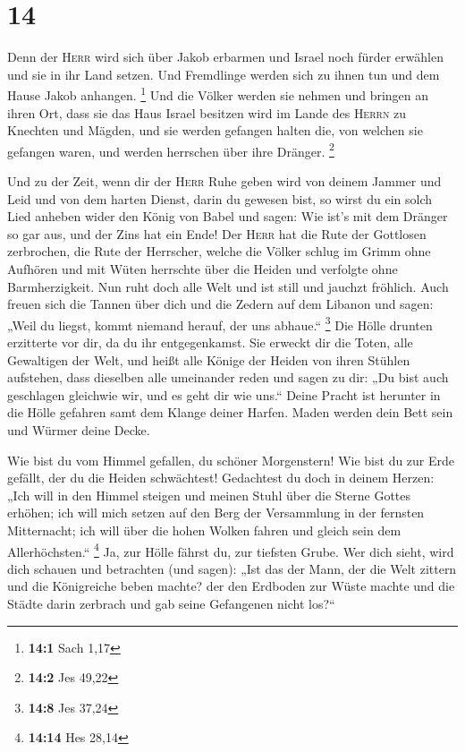 \hypertarget{section-7}{%
\section{14}\label{section-7}}

 Denn der \textsc{Herr} wird sich über Jakob erbarmen und
Israel noch fürder erwählen und sie in ihr Land setzen. Und Fremdlinge
werden sich zu ihnen tun und dem Hause Jakob anhangen. \footnote{\textbf{14:1}
  Sach 1,17}  Und die Völker werden sie nehmen und bringen
an ihren Ort, dass sie das Haus Israel besitzen wird im Lande des
\textsc{Herrn} zu Knechten und Mägden, und sie werden gefangen halten
die, von welchen sie gefangen waren, und werden herrschen über ihre
Dränger. \footnote{\textbf{14:2} Jes 49,22}

 Und zu der Zeit, wenn dir der \textsc{Herr} Ruhe geben
wird von deinem Jammer und Leid und von dem harten Dienst, darin du
gewesen bist,  so wirst du ein solch Lied anheben wider
den König von Babel und sagen: Wie ist's mit dem Dränger so gar aus, und
der Zins hat ein Ende!  Der \textsc{Herr} hat die Rute der
Gottlosen zerbrochen, die Rute der Herrscher,  welche die
Völker schlug im Grimm ohne Aufhören und mit Wüten herrschte über die
Heiden und verfolgte ohne Barmherzigkeit.  Nun ruht doch
alle Welt und ist still und jauchzt fröhlich.  Auch freuen
sich die Tannen über dich und die Zedern auf dem Libanon und sagen:
„Weil du liegst, kommt niemand herauf, der uns abhaue.`` \footnote{\textbf{14:8}
  Jes 37,24}  Die Hölle drunten erzitterte vor dir, da du
ihr entgegenkamst. Sie erweckt dir die Toten, alle Gewaltigen der Welt,
und heißt alle Könige der Heiden von ihren Stühlen aufstehen,
 dass dieselben alle umeinander reden und sagen zu dir:
„Du bist auch geschlagen gleichwie wir, und es geht dir wie uns.``
 Deine Pracht ist herunter in die Hölle gefahren samt dem
Klange deiner Harfen. Maden werden dein Bett sein und Würmer deine
Decke.

 Wie bist du vom Himmel gefallen, du schöner Morgenstern!
Wie bist du zur Erde gefällt, der du die Heiden schwächtest!
 Gedachtest du doch in deinem Herzen: „Ich will in den
Himmel steigen und meinen Stuhl über die Sterne Gottes erhöhen;
 ich will mich setzen auf den Berg der Versammlung in der
fernsten Mitternacht; ich will über die hohen Wolken fahren und gleich
sein dem Allerhöchsten.`` \footnote{\textbf{14:14} Hes 28,14}
 Ja, zur Hölle fährst du, zur tiefsten Grube.
 Wer dich sieht, wird dich schauen und betrachten (und
sagen): „Ist das der Mann, der die Welt zittern und die Königreiche
beben machte?  der den Erdboden zur Wüste machte und die
Städte darin zerbrach und gab seine Gefangenen nicht los?{}``

